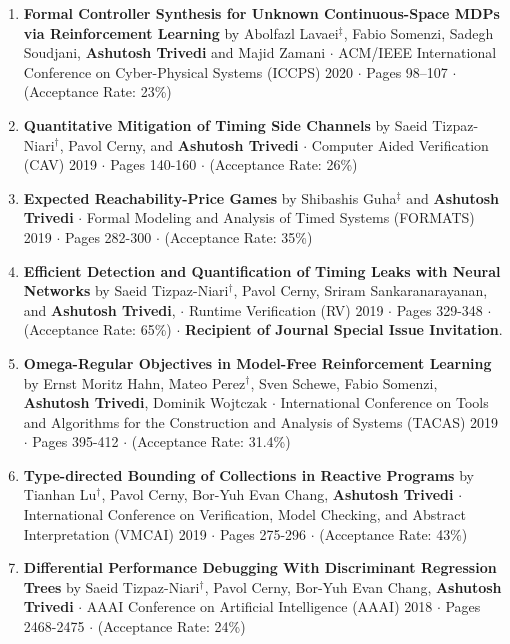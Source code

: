 \documentclass{article}
\begin{document}
\begin{enumerate}
\item {\bf Formal Controller Synthesis for Unknown Continuous-Space MDPs via
  Reinforcement Learning} by Abolfazl Lavaei${}^{\ddag}$, Fabio Somenzi, Sadegh
  Soudjani, {\bf Ashutosh Trivedi} and Majid Zamani $\cdot$ ACM/IEEE International
  Conference on Cyber-Physical Systems (ICCPS) 2020 $\cdot$ Pages 98–107 $\cdot$
  (Acceptance
  Rate: 23\%)
\item
  {\bf Quantitative Mitigation of Timing Side Channels} by Saeid Tizpaz-Niari${}^{\dag}$,
  Pavol Cerny, and {\bf Ashutosh Trivedi} $\cdot$ Computer Aided Verification (CAV) 2019 $\cdot$ Pages 140-160 $\cdot$ (Acceptance
  Rate: 26\%)
\item
{\bf Expected Reachability-Price Games} by Shibashis Guha${}^{\ddag}$ and {\bf Ashutosh Trivedi}
$\cdot$ Formal Modeling and Analysis of Timed Systems (FORMATS) 2019 $\cdot$ Pages 282-300 $\cdot$ (Acceptance Rate: 35\%)
\item
  {\bf Efficient Detection and Quantification of Timing Leaks with Neural
  Networks} by 
  Saeid Tizpaz-Niari${}^{\dag}$, Pavol Cerny, Sriram Sankaranarayanan, and {\bf
  Ashutosh Trivedi}, $\cdot$ Runtime Verification (RV) 2019 $\cdot$ Pages 329-348
  $\cdot$ (Acceptance Rate: 65\%)   $\cdot$ {\bf \color{green!40!black} Recipient
  of Journal Special Issue Invitation}.
\item
  {\bf Omega-Regular Objectives in Model-Free Reinforcement Learning} by Ernst
    Moritz Hahn, Mateo Perez${}^{\dag}$, Sven Schewe, Fabio Somenzi, {\bf Ashutosh Trivedi},
    Dominik Wojtczak $\cdot$ International Conference on Tools and Algorithms
    for the Construction and Analysis of Systems (TACAS) 2019 $\cdot$ Pages
    395-412 $\cdot$ (Acceptance
    Rate: 31.4\%)
\item
  {\bf Type-directed Bounding of Collections in Reactive Programs} by 
  Tianhan Lu${}^{\dag}$, Pavol Cerny, Bor-Yuh Evan Chang, {\bf Ashutosh Trivedi}
  $\cdot$ International Conference on Verification, Model Checking, and Abstract
  Interpretation (VMCAI) 2019 $\cdot$ Pages 275-296 $\cdot$ (Acceptance Rate: 43\%)

\item
  {\bf  Differential Performance Debugging With Discriminant Regression Trees}
  by   Saeid Tizpaz-Niari${}^{\dag}$, Pavol Cerny, Bor-Yuh Evan Chang, {\bf Ashutosh Trivedi}
  $\cdot $  AAAI Conference on Artificial Intelligence (AAAI) 2018 $\cdot$ Pages 2468-2475 $\cdot$ (Acceptance Rate: 24\%)


\end{enumerate}
\end{document}
